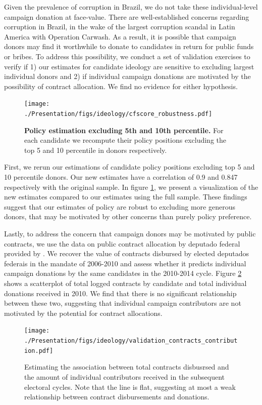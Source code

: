 \documentclass[12pt,english]{article}
\numberwithin{equation}{section}
\theoremstyle{plain}
\theoremstyle{remark}
\theoremstyle{plain}
\begin{document}
Given the prevalence of corruption in Brazil, we do not take these individual-level campaign donation at face-value. There are well-established concerns regarding corruption in Brazil, in the wake of the largest corruption scandal in Latin America with Operation Carwash. As a result, it is possible that campaign donors may find it worthwhile to donate to candidates in return for public funds or bribes. To address this possibility, we conduct a set of validation exercises to verify if 1) our estimates for candidate ideology are sensitive to excluding largest individual donors and 2) if individual campaign donations are motivated by the possibility of contract allocation. We find no evidence for either hypothesis.

\begin{figure}[h]
    \centering
    \texttt{[image: ./Presentation/figs/ideology/cfscore\_robustness.pdf]}
    \caption{\textbf{Policy estimation excluding 5th and 10th percentile.} For each candidate we recompute their policy positions excluding the top 5 and 10 percentile in donors respectively.}
    \label{fig:cfscore_percentile}
 \end{figure}

First, we rerun our estimations of candidate policy positions excluding top 5 and 10 percentile donors. Our new estimates have a correlation of 0.9 and 0.847 respectively with the original sample. In figure \ref{fig:cfscore_percentile}, we present a visualization of the new estimates compared to our estimates using the full sample. These findings suggest that our estimates of policy are robust to excluding more generous donors, that may be motivated by other concerns than purely policy preference.

Lastly, to address the concern that campaign donors may be motivated by public contracts, we use the data on public contract allocation by deputado federal provided by . We recover the value of contracts disbursed by elected deputados federais in the mandate of 2006-2010 and assess whether it predicts individual campaign donations by the same candidates in the 2010-2014 cycle. Figure \ref{fig:campaign_contract} shows a scatterplot of total logged contracts by candidate and total individual donations received in 2010. We find that there is no significant relationship between these two, suggesting that individual campaign contributors are not motivated by the potential for contract allocations.

 \begin{figure}[h]
     \centering
     \texttt{[image: ./Presentation/figs/ideology/validation\_contracts\_contribution.pdf]}
     \caption{Estimating the association between total contracts disbusrsed and the amount of individual contributors received in the subsequent electoral cycles. Note that the line is flat, suggesting at most a weak relationship between contract disbursements and donations.}
     \label{fig:campaign_contract}
 \end{figure} 
\end{document}

